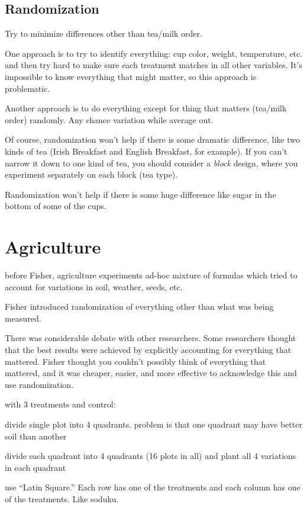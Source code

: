 \documentclass[landscape]{exam}
\begin{document}
  \subsection{Randomization}
  Try to minimize differences other than tea/milk order.

  One approach is to try to identify everything: cup color, weight, temperature,
  etc. and then try hard to make sure each treatment matches in all other
  variables.  It's impossible to know everything that might matter, so this
  approach is problematic.

  Another approach is to do everything except for thing that matters (tea/milk
  order) randomly.  Any chance variation while average out.

  Of course, randomization won't help if there is some dramatic difference, like
  two kinds of tea (Irish Breakfast and English Breakfast, for example).  If you
  can't narrow it down to one kind of tea, you should consider a {\em block}
  design, where you experiment separately on each block (tea type).

  Randomization won't help if there is some huge difference like sugar in the
  bottom of some of the cups.

  \section{Agriculture}
  \begin{itemize*}
    \item before Fisher, agriculture experiments ad-hoc mixture of formulas
      which tried to account for variations in soil, weather, seeds, etc.

    \item Fisher introduced randomization of everything other than what was
      being measured.

    \item There was considerable debate with other researchers.  Some
      researchers thought that the best results were achieved by explicitly
      accounting for everything that mattered.  Fisher thought you couldn't
      possibly think of everything that mattered, and it was cheaper, easier,
      and more effective to acknowledge this and use randomization.

    \item with 3 treatments and control:
      \begin{enumerate*}
        \item divide single plot into 4 quadrants.  problem is that one quadrant
          may have better soil than another
        \item divide each quadrant into 4 quadrants (16 plots in all) and plant
          all 4 variations in each quadrant
        \item use ``Latin Square.'' Each row has one of the treatments and each
          column has one of the treatments.  Like soduku.
      \end{enumerate*}
  \end{itemize*}
\end{document}
